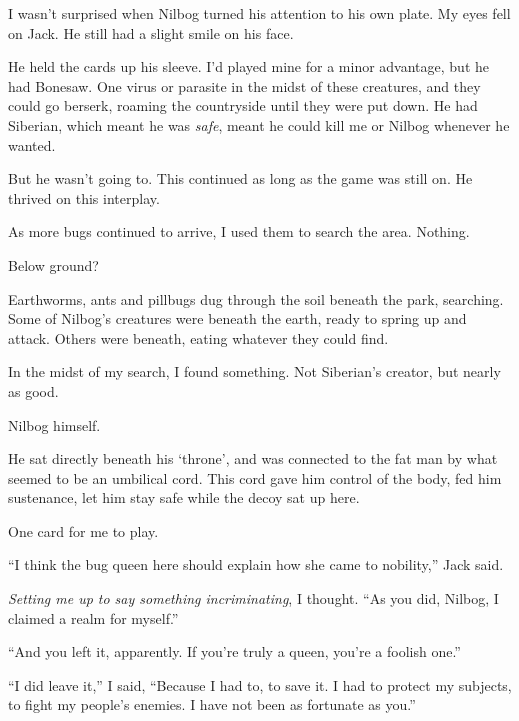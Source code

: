 I wasn't surprised when Nilbog turned his attention to his own plate.  My eyes fell on Jack.  He still had a slight smile on his face.



He held the cards up his sleeve.  I'd played mine for a minor advantage, but he had Bonesaw.  One virus or parasite in the midst of these creatures, and they could go berserk, roaming the countryside until they were put down.  He had Siberian, which meant he was \emph{safe}, meant he could kill me or Nilbog whenever he wanted.



But he wasn't going to.  This continued as long as the game was still on.  He thrived on this interplay.



As more bugs continued to arrive, I used them to search the area.  Nothing.



Below ground?



Earthworms, ants and pillbugs dug through the soil beneath the park, searching.  Some of Nilbog's creatures were beneath the earth, ready to spring up and attack.  Others were beneath, eating whatever they could find.



In the midst of my search, I found something.  Not Siberian's creator, but nearly as good.



Nilbog himself.



He sat directly beneath his `throne', and was connected to the fat man by what seemed to be an umbilical cord.  This cord gave him control of the body, fed him sustenance, let him stay safe while the decoy sat up here.



One card for me to play.



``I think the bug queen here should explain how she came to nobility,'' Jack said.



\emph{Setting me up to say something incriminating}, I thought.  ``As you did, Nilbog, I claimed a realm for myself.''



``And you left it, apparently.  If you're truly a queen, you're a foolish one.''



``I did leave it,'' I said, ``Because I had to, to save it.  I had to protect my subjects, to fight my people's enemies.  I have not been as fortunate as you.''



